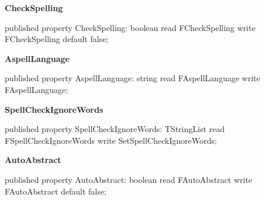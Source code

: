 \documentclass{report}
\newif\ifpdf
\begin{document}
\begin{list}{}
\begin{flushleft}
\ifpdf
\end{flushleft}
\fi


\par  \label{PasDoc_Gen.TDocGenerator-CheckSpelling}
\item[\textbf{CheckSpelling}\hfill]
\ifpdf
\begin{flushleft}
\fi
\begin{ttfamily}
published property CheckSpelling: boolean read FCheckSpelling write FCheckSpelling
      default false;\end{ttfamily}

\ifpdf
\end{flushleft}
\fi


\par  \label{PasDoc_Gen.TDocGenerator-AspellLanguage}
\item[\textbf{AspellLanguage}\hfill]
\ifpdf
\begin{flushleft}
\fi
\begin{ttfamily}
published property AspellLanguage: string read FAspellLanguage write FAspellLanguage;\end{ttfamily}

\ifpdf
\end{flushleft}
\fi


\par  \label{PasDoc_Gen.TDocGenerator-SpellCheckIgnoreWords}
\item[\textbf{SpellCheckIgnoreWords}\hfill]
\ifpdf
\begin{flushleft}
\fi
\begin{ttfamily}
published property SpellCheckIgnoreWords: TStringList
      read FSpellCheckIgnoreWords write SetSpellCheckIgnoreWords;\end{ttfamily}

\ifpdf
\end{flushleft}
\fi


\par  \label{PasDoc_Gen.TDocGenerator-AutoAbstract}
\item[\textbf{AutoAbstract}\hfill]
\ifpdf
\begin{flushleft}
\fi
\begin{ttfamily}
published property AutoAbstract: boolean read FAutoAbstract write FAutoAbstract default false;\end{ttfamily}

\ifpdf
\end{flushleft}
\fi



\end{list}
\end{document}
